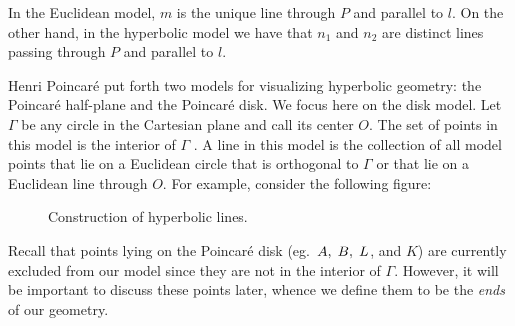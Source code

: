 \documentclass[12pt]{article}
\newcommand{\ttc}{, \hspace{1mm}}
\newcommand{\poincare}{Poincar\'{e} }
\theoremstyle{plain}
\theoremstyle{definition}
\begin{document}
In the Euclidean model, $m$ is the unique line through $P$ and parallel to $l$. On the other hand, in the hyperbolic model we have that $n_1$ and $n_2$ are distinct lines passing through $P$ and parallel to $l$. 

Henri \poincare put forth two models for visualizing hyperbolic geometry: the \poincare half-plane and the \poincare disk. We focus here on the disk model. Let $\Gamma$ be any circle in the Cartesian plane and call its center $O$. The set of points in this model is the interior of $\Gamma$ \cite{hartshorne}. A line in this model is the collection of all model points that lie on a Euclidean circle that is orthogonal to $\Gamma$ or that lie on a Euclidean line through $O$. For example, consider the following figure:

\begin{figure}[h]
\begin{center}
\end{center}
	\label{fig:construction_hyperbolic_lines}
	\caption{Construction of hyperbolic lines.}
\end{figure}
	
Recall that points lying on the \poincare disk (eg.~$A\ttc B \ttc L$, and $K$) are currently excluded from our model since they are not in the interior of $\Gamma$. However, it will be important to discuss these points later, whence we define them to be the \textit{ends} of our geometry. 
\end{document}
